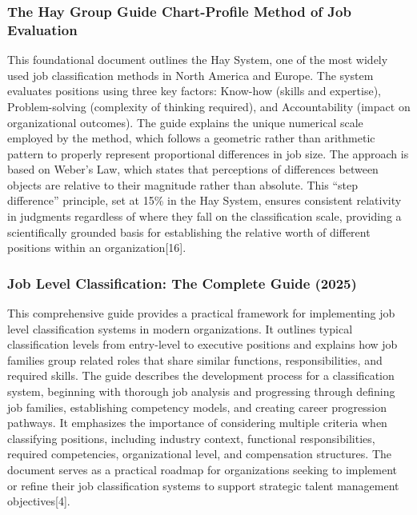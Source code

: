 \documentclass[
  letterpaper,
  DIV=11,
  numbers=noendperiod]{scrartcl}
\begin{document}
\subsubsection{The Hay Group Guide Chart-Profile Method of Job
Evaluation}\label{the-hay-group-guide-chart-profile-method-of-job-evaluation}

This foundational document outlines the Hay System, one of the most
widely used job classification methods in North America and Europe. The
system evaluates positions using three key factors: Know-how (skills and
expertise), Problem-solving (complexity of thinking required), and
Accountability (impact on organizational outcomes). The guide explains
the unique numerical scale employed by the method, which follows a
geometric rather than arithmetic pattern to properly represent
proportional differences in job size. The approach is based on Weber's
Law, which states that perceptions of differences between objects are
relative to their magnitude rather than absolute. This ``step
difference'' principle, set at 15\% in the Hay System, ensures
consistent relativity in judgments regardless of where they fall on the
classification scale, providing a scientifically grounded basis for
establishing the relative worth of different positions within an
organization{[}16{]}.

\subsubsection{Job Level Classification: The Complete Guide
(2025)}\label{job-level-classification-the-complete-guide-2025}

This comprehensive guide provides a practical framework for implementing
job level classification systems in modern organizations. It outlines
typical classification levels from entry-level to executive positions
and explains how job families group related roles that share similar
functions, responsibilities, and required skills. The guide describes
the development process for a classification system, beginning with
thorough job analysis and progressing through defining job families,
establishing competency models, and creating career progression
pathways. It emphasizes the importance of considering multiple criteria
when classifying positions, including industry context, functional
responsibilities, required competencies, organizational level, and
compensation structures. The document serves as a practical roadmap for
organizations seeking to implement or refine their job classification
systems to support strategic talent management objectives{[}4{]}.
\end{document}
